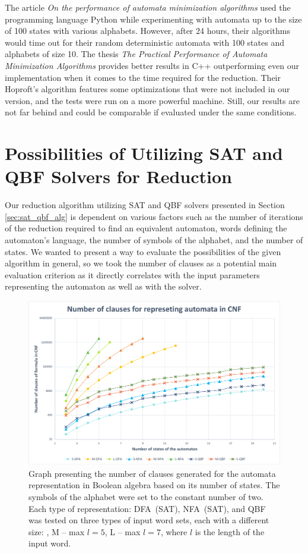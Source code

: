 The article \textit{On the performance of automata minimization algorithms} \cite{Almeida2007} used the programming language Python while experimenting with automata up to the size of 100 states with various alphabets. However, after 24 hours, their algorithms would time out for their random deterministic automata with 100 states and alphabets of size 10. The thesis \textit{The Practical Performance of Automata Minimization Algorithms} \cite{Veen2017} provides better results in C++ outperforming even our implementation when it comes to the time required for the reduction. Their Hoproft's algorithm features some optimizations that were not included in our version, and the tests were run on a more powerful machine. Still, our results are not far behind and could be comparable if evaluated under the same conditions.

\section{Possibilities of Utilizing SAT and QBF Solvers for Reduction}

Our reduction algorithm utilizing SAT and QBF solvers presented in Section \ref{sec:sat_qbf_alg} is dependent on various factors such as the number of iterations of the reduction required to find an equivalent automaton, words defining the automaton's language, the number of symbols of the alphabet, and the number of states. We wanted to present a way to evaluate the possibilities of the given algorithm in general, so we took the number of clauses as a potential main evaluation criterion as it directly correlates with the input parameters representing the automaton as well as with the solver.

\begin{figure}[hbt]
    \label{fig:graph_clauses_SAT_QBF}
    \centering
    \includegraphics[width=1\linewidth]{obrazky-figures/clauses_for_SAT_QBF.pdf}
    \caption{Graph presenting the number of clauses generated for the automata representation in Boolean algebra based on its number of states. The symbols of the alphabet were set to the constant number of two. Each type of representation: DFA~(SAT), NFA~(SAT), and QBF was tested on three types of input word sets, each with a different size: , {M -- max $l = 5$}, {L -- max $l = 7$}, where $l$ is the length of the input word.}
\end{figure}

